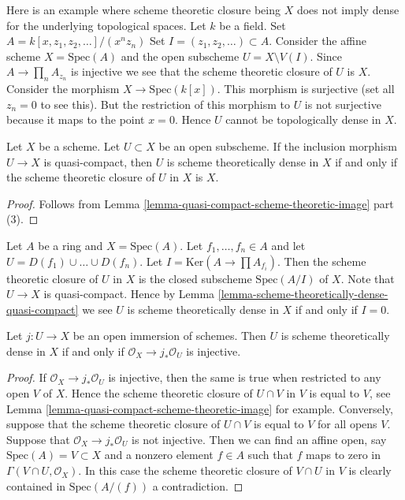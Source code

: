 \begin{example}
\label{example-scheme-theretically-dense-not-dense}
Here is an example where scheme theoretic closure being $X$ does not
imply dense for the underlying topological spaces.
Let $k$ be a field.
Set $A = k[x, z_1, z_2, \ldots]/(x^n z_n)$
Set $I = (z_1, z_2, \ldots) \subset A$.
Consider the affine scheme $X = \text{Spec}(A)$ and the
open subscheme $U = X \setminus V(I)$.
Since $A \to \prod_n A_{z_n}$ is injective we see that the scheme theoretic
closure of $U$ is $X$. Consider the morphism
$X \to \text{Spec}(k[x])$. This morphism is surjective
(set all $z_n = 0$ to see this). But the restriction
of this morphism to $U$ is not surjective because it maps
to the point $x = 0$. Hence $U$ cannot be topologically dense
in $X$.
\end{example}

\begin{lemma}
\label{lemma-scheme-theoretically-dense-quasi-compact}
Let $X$ be a scheme.
Let $U \subset X$ be an open subscheme.
If the inclusion morphism $U \to X$ is quasi-compact, then $U$
is scheme theoretically dense in $X$ if and only if the scheme theoretic
closure of $U$ in $X$ is $X$.
\end{lemma}

\begin{proof}
Follows from Lemma \ref{lemma-quasi-compact-scheme-theoretic-image} part (3).
\end{proof}

\begin{example}
\label{example-scheme-theoretic-closure}
Let $A$ be a ring and $X = \text{Spec}(A)$.
Let $f_1, \ldots, f_n \in A$ and let $U = D(f_1) \cup \ldots \cup D(f_n)$.
Let $I = \text{Ker}(A \to \prod A_{f_i})$.
Then the scheme theoretic closure of $U$ in $X$
is the closed subscheme $\text{Spec}(A/I)$ of $X$.
Note that $U \to X$ is quasi-compact. Hence by
Lemma \ref{lemma-scheme-theoretically-dense-quasi-compact}
we see $U$ is scheme theoretically dense in $X$ if and only if $I = 0$.
\end{example}

\begin{lemma}
\label{lemma-characterize-scheme-theoretically-dense}
Let $j : U \to X$ be an open immersion of schemes.
Then $U$ is scheme theoretically dense in $X$ if and only if
$\mathcal{O}_X \to j_*\mathcal{O}_U$ is injective.
\end{lemma}

\begin{proof}
If $\mathcal{O}_X \to j_*\mathcal{O}_U$ is injective,
then the same is true when restricted to any open $V$ of $X$.
Hence the scheme theoretic closure of $U \cap V$ in $V$
is equal to $V$, see Lemma \ref{lemma-quasi-compact-scheme-theoretic-image}
for example. Conversely, suppose that the scheme theoretic
closure of $U \cap V$ is equal to $V$ for all opens $V$.
Suppose that $\mathcal{O}_X \to j_*\mathcal{O}_U$ is not injective.
Then we can find an affine open, say $\text{Spec}(A) = V \subset X$
and a nonzero element $f \in A$ such that $f$ maps to zero in
$\Gamma(V \cap U, \mathcal{O}_X)$. In this case the scheme theoretic
closure of $V \cap U$ in $V$ is clearly contained in $\text{Spec}(A/(f))$
a contradiction.
\end{proof}

